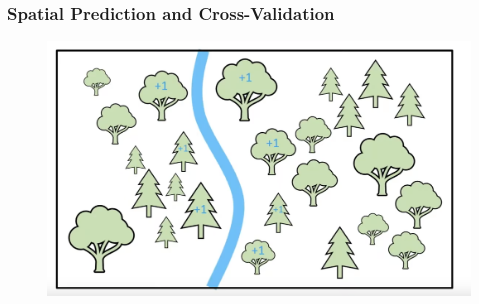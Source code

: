 \documentclass[
  shownotes,
  xcolor={svgnames},
  hyperref={colorlinks,citecolor=DarkBlue,linkcolor=andesred,urlcolor=DarkBlue}
  , aspectratio=169]{beamer}
\begin{document}
\begin{frame}[fragile]
\frametitle{Spatial Prediction and Cross-Validation}

  \begin{minipage}[c]{0.6\linewidth}
        
      \begin{figure}[H] \centering
        \captionsetup{justification=centering}
        \includegraphics[scale=0.3]{figures/spatial_cross/fig05.png}
      \end{figure}
           
    \end{minipage}
    \hfill
    \begin{minipage}[t]{0.35\linewidth}%
    

    \end{minipage}


\end{frame}
\end{document}

